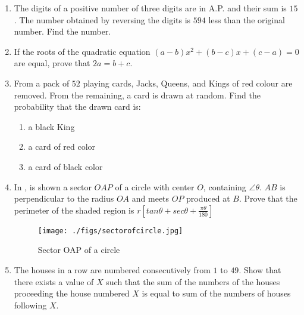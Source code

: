 \documentclass{article}
\begin{document}
\begin{enumerate}
\item The digits of a positive number of three digits are in A.P. and their sum is $15$. The number obtained by reversing the digits is $594$ less than the original number. Find the number.                                                                                             

\item If the roots of the quadratic equation $(a-b)x^2 + (b-c)x + (c-a) = 0$ are equal, prove that $2a = b + c$.                                                                                             

\item From a pack of $52$ playing cards, Jacks, Queens, and Kings of red colour are removed. From the remaining, a card is drawn at random. Find the probability that the drawn card is:
    \begin{enumerate}
        \item a black King
        \item a card of red color
        \item a card of black color
    \end{enumerate}                                                                                                                                                                                           

\item In , is shown a sector $OAP$ of a circle with center $O$, containing $\angle \theta$. $AB$ is perpendicular to the radius $OA$ and meets $OP$ produced at $B$. Prove that the perimeter of the shaded region is $r[tan\theta + sec\theta +\frac{\pi\theta}{180}]$
    \begin{figure}[H]
        \texttt{[image: ./figs/sectorofcircle.jpg]}                                     
        \caption{Sector OAP of a circle}      
        \label{fig:sectorofcircle}
    \end{figure}                                                                                             

\item The houses in a row are numbered consecutively from $1$ to $49$. Show that there exists a value of $X$ such that the sum of the numbers of the houses proceeding the house numbered $X$ is equal to sum of the numbers of houses following $X$.                                                                                                                                                                


\end{enumerate}
\end{document}
